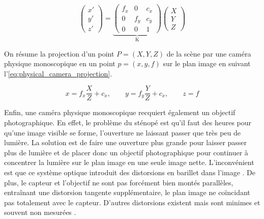 \begin{equation}
  \label{eq:projection}
  \begin{pmatrix}
    x'\\
    y'\\
    z'
  \end{pmatrix}
  =
  \underbrace{
    \begin{pmatrix}
      f_x & 0 & c_x\\
      0 & f_y & c_y\\
      0 & 0 & 1
    \end{pmatrix}
  }_\text{K}
  \begin{pmatrix}
    X\\
    Y\\
    Z
  \end{pmatrix}
\end{equation}

On résume la projection d'un point $P=(X,Y,Z)$ de la scène par une caméra physique monoscopique en un point $p=(x,y,f)$ sur le plan image en suivant l'\autoref{eq:physical_camera_projection}.

\begin{equation}
  \label{eq:physical_camera_projection}
  x = f_x \frac{X}{Z} + c_x,\qquad y = f_y \frac{Y}{Z} + c_x,\qquad z = f
\end{equation}

Enfin, une caméra physique monoscopique recquiert également un objectif photographique. En effet, le problème du sténopé est qu'il faut des heures pour qu'une image visible se forme, l'ouverture ne laissant passer que très peu de lumière. La solution est de faire une ouverture plus grande pour laisser passer plus de lumière et de placer donc un objectif photographique pour continuer à concentrer la lumière sur le plan image en une seule image nette. L'inconvénient est que ce système optique introduit des distorsions en barillet dans l'image . De plus, le capteur et l'objectif ne sont pas forcément bien montés parallèles, entraînant une distorsion tangente supplémentaire, le plan image ne coïncidant pas totalement avec le capteur. D'autres distorsions existent mais sont minimes et souvent non mesurées \citep[p.377]{Bradski2008}.


